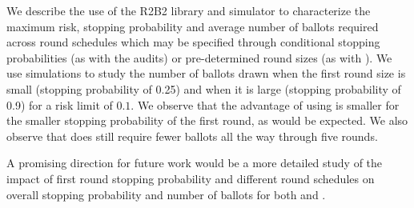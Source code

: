 We describe the use of the R2B2 library and simulator to characterize the maximum risk, stopping probability and average number of ballots required across round schedules which may be specified through conditional stopping probabilities (as with the \BRAVO audits) or pre-determined round sizes (as with \Minerva). We use simulations to study the number of ballots drawn when the first round size is small (stopping probability of 0.25) and when it is large (stopping probability of 0.9) for a risk limit of $0.1$. We observe that the advantage of using \Minerva is smaller for the smaller stopping probability of the first round, as would be expected. We also observe that \Minerva does still require fewer ballots all the way through five rounds.  

A promising direction for future work would be a more detailed study of the impact of first round stopping probability and different round schedules on overall stopping probability and number of ballots for both \Minerva and \BRAVO. 

